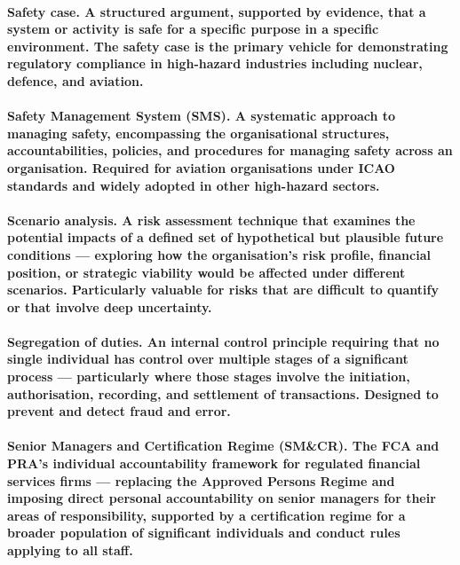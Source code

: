 \paragraph{\textbf{Safety case}. A structured argument, supported by evidence, that a system or activity is safe for a specific purpose in a specific environment. The safety case is the primary vehicle for demonstrating regulatory compliance in high-hazard industries including nuclear, defence, and aviation.}

\paragraph{\textbf{Safety Management System (SMS)}. A systematic approach to managing safety, encompassing the organisational structures, accountabilities, policies, and procedures for managing safety across an organisation. Required for aviation organisations under ICAO standards and widely adopted in other high-hazard sectors.}

\paragraph{\textbf{Scenario analysis}. A risk assessment technique that examines the potential impacts of a defined set of hypothetical but plausible future conditions — exploring how the organisation's risk profile, financial position, or strategic viability would be affected under different scenarios. Particularly valuable for risks that are difficult to quantify or that involve deep uncertainty.}

\paragraph{\textbf{Segregation of duties}. An internal control principle requiring that no single individual has control over multiple stages of a significant process — particularly where those stages involve the initiation, authorisation, recording, and settlement of transactions. Designed to prevent and detect fraud and error.}

\paragraph{\textbf{Senior Managers and Certification Regime (SM\&CR)}. The FCA and PRA's individual accountability framework for regulated financial services firms — replacing the Approved Persons Regime and imposing direct personal accountability on senior managers for their areas of responsibility, supported by a certification regime for a broader population of significant individuals and conduct rules applying to all staff.}


